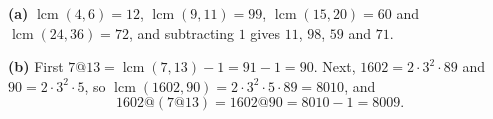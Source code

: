 \textbf{(a)} $\operatorname{lcm}(4,6)=12$, $\operatorname{lcm}(9,11)=99$, $\operatorname{lcm}(15,20)=60$ and $\operatorname{lcm}(24,36)=72$, and subtracting $1$ gives $11$, $98$, $59$ and $71$.

\textbf{(b)} First $7@13=\operatorname{lcm}(7,13)-1=91-1=90$. Next, $1602=2\cdot3^2\cdot89$ and $90=2\cdot3^2\cdot5$, so $\operatorname{lcm}(1602,90)=2\cdot3^2\cdot5\cdot89=8010$, and
\[1602@(7@13)=1602@90=8010-1=\boxed{8009}.\]
